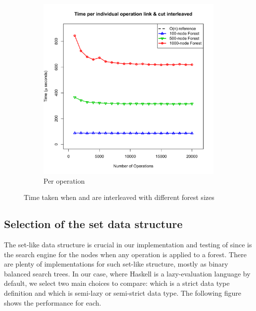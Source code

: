 \begin{figure}[H]
\begin{subfigure}{.5\textwidth}
  \includegraphics[scale=0.38]{./Images/plotLCForests}
  \caption{Per operation}
\end{subfigure}
\caption{Time taken when \link and \cut are interleaved with different forest sizes}
\label{fig:EachOp}
\end{figure}

\subsection{Selection of the set data structure}
The set-like data structure is crucial in our implementation and testing of \dyntset since is the search engine for the nodes when any operation is applied to a forest. There are plenty of implementations for such set-like structure, mostly as binary balanced search trees. In our case, where Haskell is a lazy-evaluation language by default, we select two main choices to compare:  which is a strict data type definition and  which is semi-lazy or semi-strict data type. The following figure shows the performance for each.


